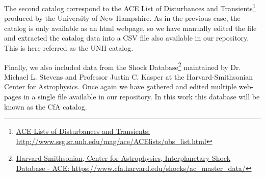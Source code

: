 The second catalog correspond to the ACE List of Disturbances and Transients\footnote{\href{http://www.ssg.sr.unh.edu/mag/ace/ACElists/obs\_list.html}{ACE Lists of Disturbances and Transients: http://www.ssg.sr.unh.edu/mag/ace/ACElists/obs\_list.html}} produced by the University of New Hampshire. As in the previous case, the catalog is only available as an html webpage, so we have manually edited the file and extracted the catalog data into a CSV file also available in our repository. This is here referred as the UNH catalog.

Finally, we also included data from the Shock Database\footnote{\href{https://www.cfa.harvard.edu/shocks/ac_master_data/}{Harvard-Smithsonian, Center for Astrophysics, Interplanetary Shock Database - ACE: https://www.cfa.harvard.edu/shocks/ac\_master\_data/}} maintained by Dr. Michael L. Stevens and Professor Justin C. Kasper at the Harvard-Smithsonian Center for Astrophysics. Once again we have gathered and edited multiple web-pages in a single file available in our repository. In this work this database will be known as the CfA catalog.